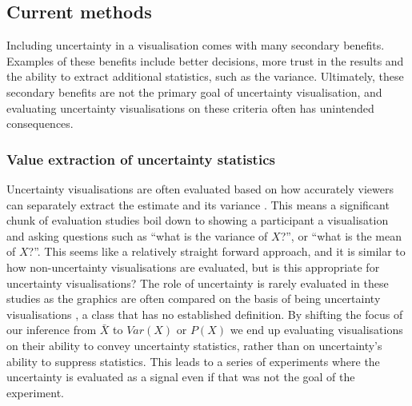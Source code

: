 \documentclass[
  12pt]{article}
\begin{document}
\subsection{Current methods}\label{current-methods}

Including uncertainty in a visualisation comes with many secondary
benefits. Examples of these benefits include better decisions, more
trust in the results and the ability to extract additional statistics,
such as the variance. Ultimately, these secondary benefits are not the
primary goal of uncertainty visualisation, and evaluating uncertainty
visualisations on these criteria often has unintended consequences.

\subsubsection{Value extraction of uncertainty
statistics}\label{value-extraction-of-uncertainty-statistics}

Uncertainty visualisations are often evaluated based on how accurately
\citep{Hullman2019} viewers can separately extract the estimate and its
variance \citep{Kinkeldey2014}. This means a significant chunk of
evaluation studies boil down to showing a participant a visualisation
and asking questions such as ``what is the variance of \(X\)?'', or
``what is the mean of \(X\)?''. This seems like a relatively straight
forward approach, and it is similar to how non-uncertainty
visualisations are evaluated, but is this appropriate for uncertainty
visualisations? The role of uncertainty is rarely evaluated in these
studies as the graphics are often compared on the basis of being
uncertainty visualisations \citep{Ibrekk1987, Hullman2015, Hofman2020},
a class that has no established definition. By shifting the focus of our
inference from \(\bar{X}\) to \(Var(X)\) or \(P(X)\) we end up
evaluating visualisations on their ability to convey uncertainty
statistics, rather than on uncertainty's ability to suppress statistics.
This leads to a series of experiments where the uncertainty is evaluated
as a signal even if that was not the goal of the experiment.
\end{document}
